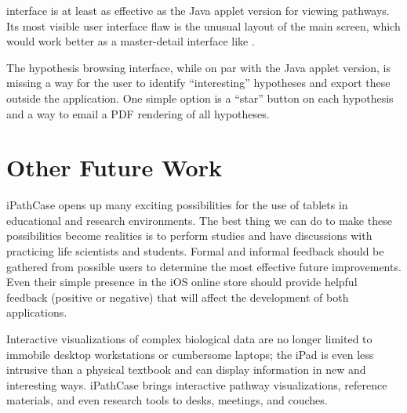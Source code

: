 \mawappp interface is at least as effective as the Java applet version for
viewing pathways. Its most visible user interface flaw is the unusual layout of
the main screen, which would work better as a master-detail interface like
\keggappp.

The hypothesis browsing interface, while on par with the Java applet version, is
missing a way for the user to identify ``interesting'' hypotheses and export
these outside the application. One simple option is a ``star'' button on each
hypothesis and a way to email a PDF rendering of all hypotheses.

\section{Other Future Work}

iPathCase opens up many exciting possibilities for the use of tablets in
educational and research environments. The best thing we can do to make these
possibilities become realities is to perform studies and have discussions with
practicing life scientists and students. Formal and informal feedback should be
gathered from possible users to determine the most effective future
improvements. Even their simple presence in the iOS online store should provide
helpful feedback (positive or negative) that will affect the development of both
applications.

Interactive visualizations of complex biological data are no longer limited to
immobile desktop workstations or cumbersome laptops; the iPad is even less
intrusive than a physical textbook and can display information in new and
interesting ways. iPathCase brings interactive pathway visualizations, reference
materials, and even research tools to desks, meetings, and couches.
